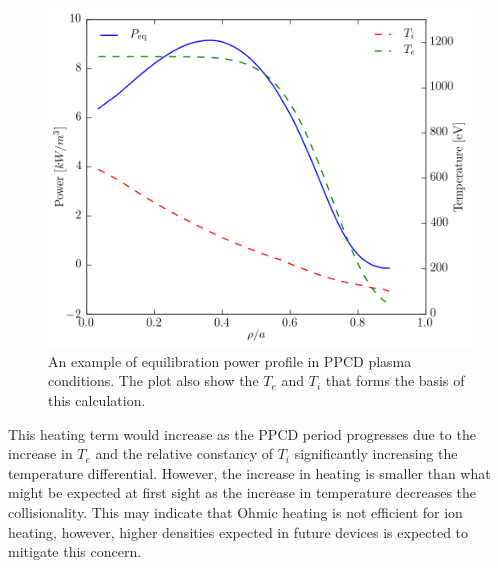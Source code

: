\begin{refsection}
\begin{figure}[!htb]
	\centering
	\includegraphics[width = 0.75\linewidth]{./transport_modeling/p_eq.png}
    \caption[Example equilibration power profile.]{An example of equilibration power profile in PPCD plasma conditions. The plot also show the $T_e$ and $T_i$ that forms the basis of this calculation.}\label{fig:P_eq}
\end{figure}%



This heating term would increase as the PPCD period progresses due to the increase in $T_e$ and the relative constancy of $T_i$ significantly increasing the temperature differential. However, the increase in heating is smaller than what might be expected at first sight as the increase in temperature decreases the collisionality. This may indicate that Ohmic heating is not efficient for ion heating, however, higher densities expected in future devices is expected to mitigate this concern. 


\end{refsection}
